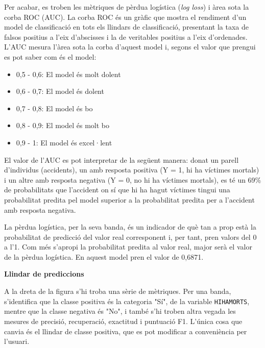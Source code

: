 \documentclass[11pt,longbibliography]{article}
\theoremstyle{definition}
\theoremstyle{remark}
\begin{document}
Per acabar, es troben les mètriques de pèrdua logística (\emph{log loss}) i àrea sota la corba ROC (AUC). La corba ROC és un gràfic que mostra el rendiment d'un model de classificació en tots els llindars de classificació, presentant la taxa de falsos positius a l'eix d'abscisses i la de veritables positius a l'eix d'ordenades. L'AUC mesura l'àrea sota la corba d'aquest model i, segons el valor que prengui es pot saber com és el model:



\begin{itemize}

\item 0,5 - 0,6: El model és molt dolent

\item 0,6 - 0,7: El model és dolent

\item 0,7 - 0,8: El model és bo

\item 0,8 - 0,9: El model és molt bo

\item 0,9 - 1: El model és excel·lent

\end{itemize}



El valor de l’AUC es pot interpretar de la següent manera: donat un parell d’individus (accidents), un amb resposta positiva (Y = 1, hi ha víctimes mortals) i un altre amb resposta negativa (Y = 0, no hi ha víctimes mortals), es té un 69\% de probabilitats que l'accident on sí que hi ha hagut víctimes tingui una probabilitat predita pel model superior a la probabilitat predita per a l'accident amb resposta negativa.



La pèrdua logística, per la seva banda, és un indicador de què tan a prop està la probabilitat de predicció del valor real corresponent i, per tant, pren valors del 0 a l'1. Com més s'apropi la probabilitat predita al valor real, major serà el valor de la pèrdua logística. En aquest model pren el valor de 0,6871.



\textbf{Llindar de prediccions}



A la dreta de la figura s'hi troba una sèrie de mètriques. Per una banda, s'identifica que la classe positiva és la categoria "Sí", de la variable \texttt{HIHAMORTS}, mentre que la classe negativa és "No", i també s'hi troben altra vegada les mesures de precisió, recuperació, exactitud i puntuació F1. L'única cosa que canvia és el llindar de classe positiva, que es pot modificar a conveniència per l'usuari.
\end{document}
